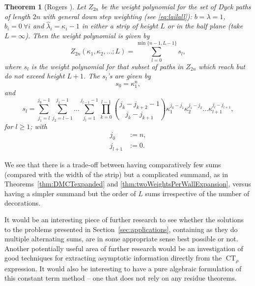 \documentclass[11pt,a4paper]{article}
\DeclareMathOperator{\CT}{CT}
\newtheorem{theorem}{Theorem}
\newcommand{\ka}{\kappa}
\newcommand{\p}{\rho}
\newcommand{\df}{:=}
\begin{document}
\begin{theorem}[Rogers \cite{rogers:1907rc}] \label{thm:allweightsDyck} Let $Z_{2n}$ be the weight polynomial for the set of Dyck paths of length $2n$ with general down step weighting (see \eqref{eq:lailall}):  $b=\lambda=1$, $\hat b_i=0\ \forall i$ and $\hat\lambda_i= \kappa_i-1$	
in either a strip of height $L$ or in the half plane (take $L=\infty$).  Then the weight polynomial is given by
\begin{equation}
Z_{2n}(\ka_1, \ka_2, ...;L)=\sum_{l=0}^{\min \{n-1, L-1\}} s_l,
\end{equation}
where $s_l$ is the weight polynomial for that subset of paths in $Z_{2n}$ which reach but do not exceed height $L+1$.   The $s_l$'s are given by
\begin{equation}
s_0=\ka_1^n,
\end{equation}
and
\begin{equation}
s_l = 
\sum_{j_1=l}^{j_0-1}\sum_{j_2=l-1}^{j_1-1} \hdots \sum_{j_l=1}^{j_{l-1}-1} 
\prod_{k=0}^{l-1} \binom{j_k-j_{k+2}-1}{j_{k}-j_{k+1}} \ka_1^{j_0-j_1} \ka_2^{j_1-j_2} \hdots \ka_{l+1}^{j_l-j_{l+1}},
\end{equation}
for $l \ge 1$; with
\begin{align}
j_0 &\df   n, \\
j_{l+1}&\df   0.
\end{align}
\end{theorem}

We see that there is a trade-off between having comparatively few sums (compared with the width of the strip) but a complicated summand, as in Theorems~\ref{thm:DMCTexpanded} and \ref{thm:twoWeightsPerWallExpansion}, versus having a simpler summand but the order of $L$ sums irrespective of the number of decorations.  
 
  
It would be an interesting piece of further research to see whether the solutions to the problems presented in Section~\ref{sec:applications}, containing as they do multiple alternating sums, are in some appropriate sense best possible or not.  Another potentially useful area of further research would be an investigation of good techniques for extracting asymptotic information directly from the $\CT_\p$ expression.  It would also be interesting to have a pure algebraic formulation of this constant term method -- one that does not rely on any residue theorems.
\end{document}
